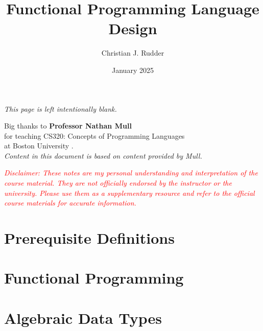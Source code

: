\documentclass{memoir}
\title{Functional Programming Language Design}
\author{Christian J. Rudder}
\date{January 2025}
\begin{document}
\maketitle
\setcounter{secnumdepth}{2} %
\setcounter{tocdepth}{2}

\tableofcontents

\newpage
\thispagestyle{empty}
\mbox{}
\vfill
\begin{center}
    \textit{This page is left intentionally blank.}
\end{center}
\vfill
\newpage
\thispagestyle{empty}
\mbox{}
\vfill
\begin{center}
    \Large{Big thanks to \textbf{Professor Nathan Mull}}\\
    \normalsize 
    for teaching CS320: Concepts of Programming Languages\\
    at Boston University \cite{mull_cs320}.\\
    \textit{Content in this document is based on content provided by Mull.}\\
    \vfill
    \begin{center}
        \textcolor{red}{\textit{Disclaimer: These notes are my personal understanding and interpretation of the course material. 
        They are not officially endorsed by the instructor or the university. Please use them as a supplementary resource and refer 
        to the official course materials for accurate information.}}
    \end{center}
\end{center}

\vfill

\chapter*{Prerequisite Definitions}


\chapter{Functional Programming}





\chapter {Algebraic Data Types}

\end{document}
